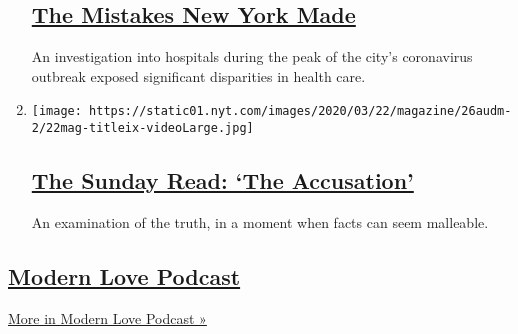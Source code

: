 \begin{enumerate}
  \hypertarget{the-mistakes-new-york-made}{%
  \subsection{\texorpdfstring{\href{/2020/07/27/podcasts/the-daily/new-york-hospitals-covid.html}{The
  Mistakes New York
  Made}}{The Mistakes New York Made}}\label{the-mistakes-new-york-made}}

  An investigation into hospitals during the peak of the city's
  coronavirus outbreak exposed significant disparities in health care.
\item
  \texttt{[image: https://static01.nyt.com/images/2020/03/22/magazine/26audm-2/22mag-titleix-videoLarge.jpg]}

  \hypertarget{the-sunday-read-the-accusation}{%
  \subsection{\texorpdfstring{\href{/2020/07/26/podcasts/the-daily/the-accusation-the-sunday-read.html}{The
  Sunday Read: `The
  Accusation'}}{The Sunday Read: `The Accusation'}}\label{the-sunday-read-the-accusation}}

  An examination of the truth, in a moment when facts can seem
  malleable.
\end{enumerate}

\hypertarget{modern-love-podcast-1}{%
\subsection{\texorpdfstring{\href{/column/modern-love-podcast}{Modern
Love Podcast}}{Modern Love Podcast}}\label{modern-love-podcast-1}}

\href{/column/modern-love-podcast}{More in Modern Love Podcast »}


